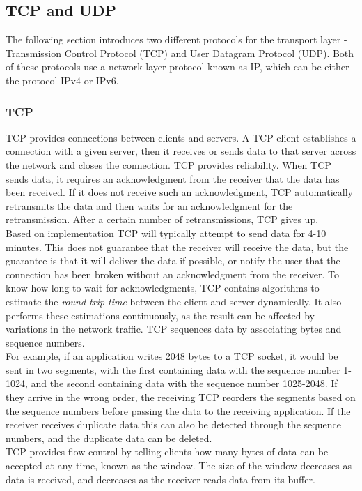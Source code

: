 \subsection{TCP and UDP}\label{sec:tcp-udp}
The following section introduces two different protocols for the transport layer - Transmission Control Protocol (TCP) and User Datagram Protocol (UDP).
Both of these protocols use a network-layer protocol known as IP, which can be either the protocol IPv4 or IPv6.

\subsubsection{TCP}
TCP provides connections between clients and servers.
A TCP client establishes a connection with a given server, then it receives or sends data to that server across the network and closes the connection.
TCP provides reliability.
When TCP sends data, it requires an acknowledgment from the receiver that the data has been received.
If it does not receive such an acknowledgment, TCP automatically retransmits the data and then waits for an acknowledgment for the retransmission.
After a certain number of retransmissions, TCP gives up.\\
Based on implementation TCP will typically attempt to send data for 4-10 minutes.
This does not guarantee that the receiver will receive the data, but the guarantee is that it will deliver the data if possible, or notify the user that the connection has been broken without an acknowledgment from the receiver.
To know how long to wait for acknowledgments, TCP contains algorithms to estimate the \textit{round-trip time} between the client and server dynamically.
It also performs these estimations continuously, as the result can be affected by variations in the network traffic.
TCP sequences data by associating bytes and sequence numbers.\\
For example, if an application writes 2048 bytes to a TCP socket, it would be sent in two segments, with the first containing data with the sequence number 1-1024, and the second containing data with the sequence number 1025-2048.
If they arrive in the wrong order, the receiving TCP reorders the segments based on the sequence numbers before passing the data to the receiving application.
If the receiver receives duplicate data this can also be detected through the sequence numbers, and the duplicate data can be deleted.\\
TCP provides flow control by telling clients how many bytes of data can be accepted at any time, known as the window.
The size of the window decreases as data is received, and decreases as the receiver reads data from its buffer.

